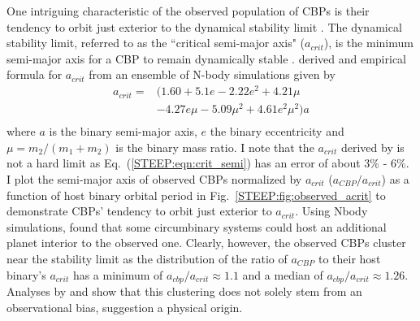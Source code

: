 One intriguing characteristic of the observed population of \kepler CBPs is their tendency to orbit just exterior to the dynamical stability limit \citep{Welsh2014,Winn2015}.  The dynamical stability limit, referred to as the ``critical semi-major axis" ($a_{crit}$), is the minimum semi-major axis for a CBP to remain dynamically stable \citep{Dvorak1989,Holman1999}.  \citet{Holman1999} derived and empirical formula for $a_{crit}$ from an ensemble of N-body simulations given by
\begin{equation}
\begin{split} \label{STEEP:eqn:crit_semi}
a_{crit} = & (1.60 + 5.1e -2.22 e^2 + 4.21 \mu \\
& -4.27e \mu -5.09 \mu^2 + 4.61 e^2 \mu^2) a \\
\end{split}
\end{equation}
where $a$ is the binary semi-major axis, $e$ the binary eccentricity and $\mu = m_2 / (m_1 + m_2)$ is the binary mass ratio.  I note that the $a_{crit}$ derived by \citet{Holman1999} is not a hard limit as Eq.~(\ref{STEEP:eqn:crit_semi}) has an error of about $3\%$ - $6\%$. I plot the semi-major axis of observed \kepler CBPs normalized by $a_{crit}$ ($a_{CBP}/a_{crit}$) as a function of host binary orbital period in Fig.~\ref{STEEP:fig:observed_acrit} to demonstrate CBPs' tendency to orbit just exterior to $a_{crit}$.  Using Nbody simulations, \citet{Quarles2018} found that some \kepler circumbinary systems could host an additional planet interior to the observed one.  Clearly, however, the observed CBPs cluster near the stability limit as the distribution of the ratio of $a_{CBP}$ to their host binary's $a_{crit}$ has a minimum of $a_{cbp}/a_{crit}{\approx} 1.1$ and a median of $a_{cbp}/a_{crit}{\approx} 1.26$. Analyses by \citet{Martin2014} and \citet{Li2016} show that this clustering does not solely stem from an observational bias, suggestion a physical origin.

